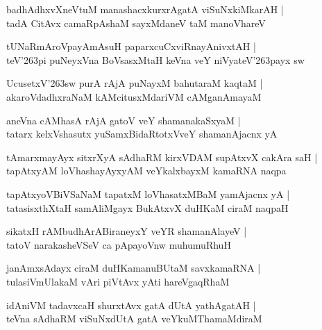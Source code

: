 \begin{shloka}
badhAdhxvXneVtuM manashacxkurxrAgatA viSuNxkiMkarAH |\\
tadA CitAvx camaRpAshaM sayxMdaneV taM manoVhareV
\end{shloka}

\begin{shloka}
tUNaRmAroVpayAmAsuH paparxcuCxviRnayAnivxtAH |\\
teV\char'263pi puNeyxVna BoVsasxMtaH keVna veY niVyateV\char'263payx sw
\end{shloka}

\begin{shloka}
UcusetxV\char'263sw purA rAjA puNayxM bahutaraM kaqtaM |\\
akaroVdadhxraNaM kAMcitusxMdariVM cAMganAmayaM
\end{shloka}

\begin{shloka}
aneVna cAMhasA rAjA gatoV veY shamanakaSxyaM |\\
tatarx kelxVshasutx yuSamxBidaRtotxVveY shamanAjacnx yA 
\end{shloka}

\begin{shloka}
tAmarxmayAyx sitxrXyA sAdhaRM kirxVDAM supAtxvX cakAra saH |\\
tapAtxyAM loVhashayAyxyAM veYkalxbayxM kamaRNA naqpa 
\end{shloka}

\begin{shloka}
tapAtxyoVBiVSaNaM tapatxM loVhasatxMBaM yamAjacnx yA |\\
tatasisxthXtaH samAliMgayx BukAtxvX duHKaM ciraM naqpaH
\end{shloka}

\begin{shloka}
sikatxH rAMbudhArABiraneyxY veYR shamanAlayeV |\\
tatoV narakasheVSeV ca pApayoVnw muhumuRhuH 
\end{shloka}

\begin{shloka}
janAmxsAdayx ciraM duHKamanuBUtaM savxkamaRNA |\\
tulasiVmUlakaM vAri piVtAvx yAti hareVgaqRhaM 
\end{shloka}

\begin{shloka}
idAniVM tadavxcaH shurxtAvx gatA dUtA yathAgatAH |\\
teVna sAdhaRM viSuNxdUtA gatA veYkuMThamaMdiraM 
\end{shloka}

